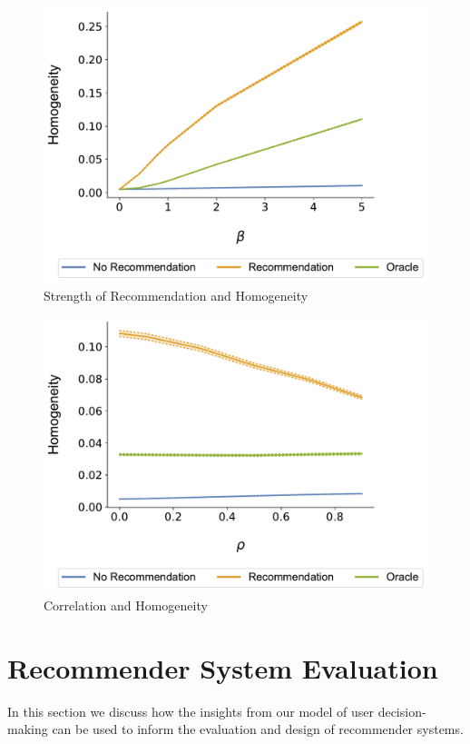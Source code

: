 \documentclass[sigconf]{acmart}
\begin{document}
\begin{figure}
\includegraphics[scale=0.1]{figures/beta_homogeneity_N_200_T_20}
\caption{Strength of Recommendation and Homogeneity}
\label{fig:beta_homo}
\end{figure}

\begin{figure}
\includegraphics[scale=0.1]{figures/rho_homogeneity_N_200_T_20}
\caption{Correlation and Homogeneity}
\label{fig:cor_homo}
\end{figure}

\section{Recommender System Evaluation}

In this section we discuss how the insights from our model of user decision-making can be used to inform the evaluation and design of recommender systems.
\end{document}
